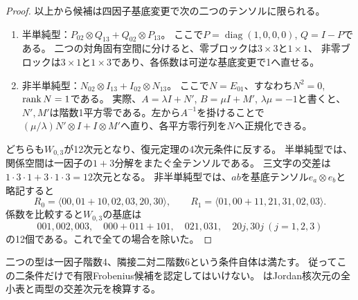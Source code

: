 \begin{proof}
以上から候補は四因子基底変更で次の二つのテンソルに限られる。
\begin{enumerate}
\item 半単純型：$P_{02}\otimes Q_{13}+Q_{02}\otimes P_{13}$。
ここで$P=\operatorname{diag}(1,0,0,0)$, $Q=I-P$である。
二つの対角固有空間に分けると、零ブロックは$3\times3$と$1\times1$、
非零ブロックは$3\times1$と$1\times3$であり、各係数は可逆な基底変更で1へ直せる。
\item 非半単純型：$N_{02}\otimes I_{13}+I_{02}\otimes N_{13}$。
ここで$N=E_{01}$、すなわち$N^2=0$, $\operatorname{rank} N=1$である。
実際、$A=\lambda I+N'$, $B=\mu I+M'$, $\lambda\mu=-1$と書くと、
$N',M'$は階数1平方零である。左から$A^{-1}$を掛けることで
$(\mu/\lambda)N'\otimes I+I\otimes M'$へ直り、各平方零行列を$N$へ正規化できる。
\end{enumerate}
どちらも$W_{0,3}$が12次元となり、復元定理の4次元条件に反する。
半単純型では、関係空間は一因子の$1+3$分解をまたぐ全テンソルである。
三文字の交差は$1\cdot3\cdot1+3\cdot1\cdot3=12$次元となる。
非半単純型では、$ab$を基底テンソル$e_a\otimes e_b$と略記すると
\[
 R_0=\langle00,01+10,02,03,20,30\rangle,\qquad
 R_1=\langle01,00+11,21,31,02,03\rangle.
\]
係数を比較すると$W_{0,3}$の基底は
\[
 001,002,003,\quad000+011+101,\quad021,031,\quad
 20j,30j\ (j=1,2,3)
\]
の12個である。これで全ての場合を除いた。
\end{proof}
\begin{remark}
二つの型は一因子階数4、隣接二対二階数6という条件自体は満たす。
従ってこの二条件だけで有限Frobenius候補を認定してはいけない。
はJordan核次元の全小表と両型の交差次元を検算する。
\end{remark}
